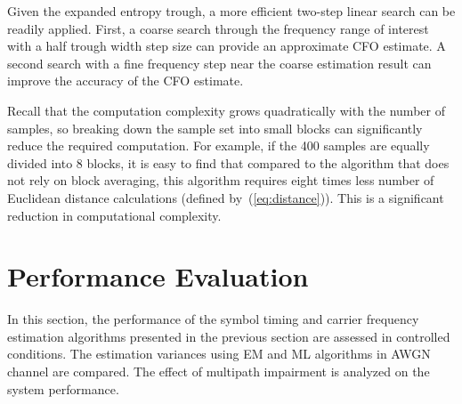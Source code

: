 \documentclass[journal,comsoc]{IEEEtran}
\begin{document}
Given the expanded entropy trough, a more efficient two-step linear search can be readily applied.
First, a coarse search through the frequency range of interest with a half trough width step size can provide an approximate CFO estimate.
A second search with a fine frequency step near the coarse estimation result can improve the accuracy of the CFO estimate.

Recall that the computation complexity grows quadratically with the number of samples, so breaking down the sample set into small blocks can significantly reduce the required computation.
For example, if the 400 samples are equally divided into 8 blocks, it is easy to find that compared to the algorithm that does not rely on block averaging, 
this algorithm requires eight times less number of Euclidean distance calculations (defined by~(\ref{eq:distance})). 
This is a significant reduction in computational complexity. 




\section{Performance Evaluation}
\label{sec:perfo}
In this section, the performance of the symbol timing and carrier frequency estimation algorithms presented in the previous section are assessed in controlled conditions.
The estimation variances using EM and ML algorithms in AWGN channel are compared.
The effect of multipath impairment is analyzed on the system performance.
\end{document}
